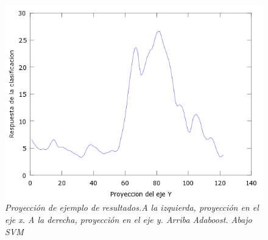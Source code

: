 \begin{figure}[H]
  \includegraphics[scale=.4]{images/plots/svm4Y}
 \caption{\em  Proyección de ejemplo de resultados.A la izquierda, proyección en el eje x. A la derecha, proyección en el eje y. Arriba Adaboost. Abajo SVM}   
 \label{fig:pro4}
\end{figure}

